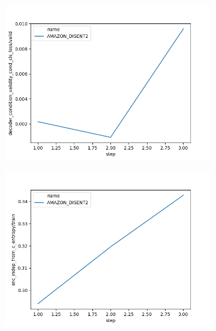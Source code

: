 \begin{figure}[h]
\begin{subfigure}{0.3\textheight}
		\includegraphics[width=1.\textwidth]{images/figs2/2020_01_15__12_10_34__decoder_condition_validity_cond_cls_loss.png}
		\caption{}
		\label{fig:chap4:amazon_disent_xcls}
	\end{subfigure}
	\begin{subfigure}{0.3\textheight}
		\centering
		\includegraphics[width=1.\textwidth]{images/figs2/2020_01_15__11_44_04__enc_indep_from_c_entropy.png}
		\caption{}
		\label{fig:chap4:amazon_disent_indp}
	\end{subfigure}
	\begin{subfigure}{0.3\textheight}
		\centering

\end{subfigure}
\end{figure}
